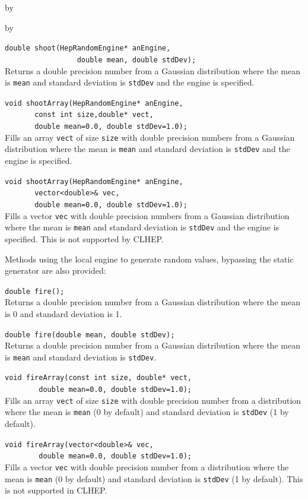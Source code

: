 \documentclass[twoside]{article}
\newcommand{\comp}[1]{\texttt{#1}}%
\newcommand{\entrylabel}[1]{\mbox{\textbf{{#1}}}\hfil}%
\newenvironment{entry}
{\begin{list}{}%
    {\renewcommand{\makelabel}{\entrylabel}%
     \setlength{\labelwidth}{90pt}%
     \setlength{\leftmargin}{\labelwidth}
     \advance\leftmargin by \labelsep%
      }%
    }%
  {\end{list}}
\newcommand{\Entrylabel}[1]%
{\raisebox{0pt}[1ex][0pt]{\makebox[\labelwidth][l]%
    {\parbox[t]{\labelwidth}{\hspace{0pt}\textbf{{#1}}}}}}
\newenvironment{Entry}%
{\renewcommand{\entrylabel}{\Entrylabel}\begin{entry}}%
  {\end{entry}}
\begin{document}
\begin{description}
\begin{Entry}
\begin{Entry}
  \verb+double shoot(HepRandomEngine* anEngine,+\\ 
  \verb+                 double mean, double stdDev);+\\
  Returns a double precision number from a Gaussian distribution where the
  mean is \comp{mean} and standard deviation is \comp{stdDev}
  and the engine is specified.

  \verb+void shootArray(HepRandomEngine* anEngine,+\\
  \verb+       const int size,double* vect,+\\ 
  \verb+       double mean=0.0, double stdDev=1.0);+\\
  Fills an array \comp{vect} of size \comp{size} with double precision
  numbers from a Gaussian distribution where the
  mean is \comp{mean} and standard deviation is \comp{stdDev}
  and the engine is specified.

  \verb+void shootArray(HepRandomEngine* anEngine,+\\
  \verb+       vector<double>& vec,+\\ 
  \verb+       double mean=0.0, double stdDev=1.0);+\\
  Fills a vector \comp{vec} with double precision
  numbers from a Gaussian distribution where the
  mean is \comp{mean} and standard deviation is \comp{stdDev}
  and the engine is specified.  This is not supported by CLHEP.
  
  Methods using the local engine to generate random values, bypassing
  the static generator are also provided:

  \verb+double fire();+\\
  Returns a double precision number from a Gaussian distribution where the
  mean is 0 and standard deviation is 1.
  
  \verb+double fire(double mean, double stdDev);+\\
  Returns a double precision number from a Gaussian distribution where the
  mean is \comp{mean} and standard deviation is \comp{stdDev}.
  
  \verb+void fireArray(const int size, double* vect,+\\
  \verb+        double mean=0.0, double stdDev=1.0);+\\
  Fills an array \comp{vect} of size \comp{size} with double
  precision number from a distribution where the
  mean is \comp{mean} (0 by default) and standard
  deviation is \comp{stdDev} (1 by default).

  \verb+void fireArray(vector<double>& vec,+\\
  \verb+        double mean=0.0, double stdDev=1.0);+\\
  Fills a vector \comp{vec} with double
  precision number from a distribution where the
  mean is \comp{mean} (0 by default) and standard
  deviation is \comp{stdDev} (1 by default).  This is not
  supported in CLHEP.
  

\end{Entry}
\end{Entry}
\end{description}
\end{document}
